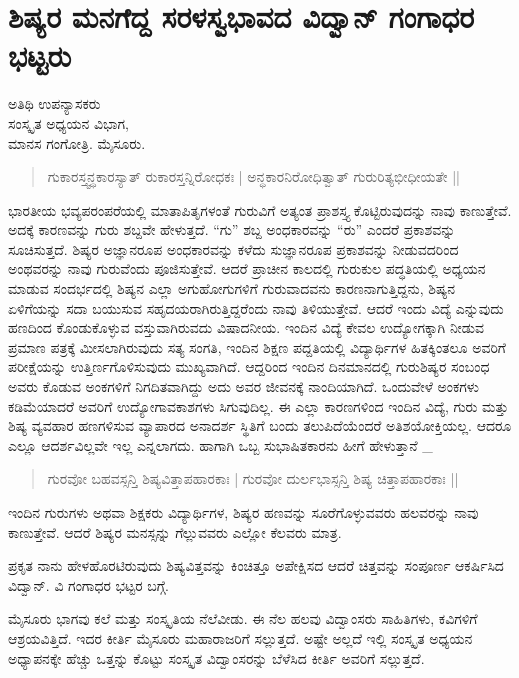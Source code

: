 \chapter{ಶಿಷ್ಯರ ಮನಗೆದ್ದ ಸರಳಸ್ವಭಾವದ ವಿದ್ವಾನ್ ಗಂಗಾಧರ ಭಟ್ಟರು}

\begin{center}
\smallskip
ಅತಿಥಿ ಉಪನ್ಯಾಸಕರು\\
ಸಂಸ್ಕೃತ ಅಧ್ಯಯನ ವಿಭಾಗ,\\
ಮಾನಸ ಗಂಗೋತ್ರಿ. ಮೈಸೂರು.

\end{center}
\begin{verse}
ಗುಕಾರಸ್ತ್ವನ್ಧಕಾರಸ್ಯಾತ್ ರುಕಾರಸ್ತನ್ನಿರೋಧಕಃ |
ಅನ್ಧಕಾರನಿರೋಧಿತ್ವಾತ್ ಗುರುರಿತ್ಯಭೀಧೀಯತೇ ||
\end{verse}
ಭಾರತೀಯ ಭವ್ಯಪರಂಪರೆಯಲ್ಲಿ ಮಾತಾಪಿತೃಗಳಂತೆ ಗುರುವಿಗೆ ಅತ್ಯಂತ ಪ್ರಾಶಸ್ತ್ಯ ಕೊಟ್ಟಿರುವುದನ್ನು ನಾವು ಕಾಣುತ್ತೇವೆ. ಅದಕ್ಕೆ ಕಾರಣವನ್ನು ಗುರು ಶಬ್ದವೇ ಹೇಳುತ್ತದೆ. “ಗು” ಶಬ್ದ ಅಂಧಕಾರವನ್ನು “ರು” ಎಂದರೆ ಪ್ರಕಾಶವನ್ನು ಸೂಚಿಸುತ್ತದೆ. ಶಿಷ್ಯರ ಅಜ್ಞಾನರೂಪ ಅಂಧಕಾರವನ್ನು ಕಳೆದು ಸುಜ್ಞಾನರೂಪ ಪ್ರಕಾಶವನ್ನು ನೀಡುವದರಿಂದ ಅಂಥವರನ್ನು ನಾವು ಗುರುವೆಂದು ಪೂಜಿಸುತ್ತೇವೆ. ಆದರೆ ಪ್ರಾಚೀನ ಕಾಲದಲ್ಲಿ ಗುರುಕುಲ ಪದ್ಧತಿಯಲ್ಲಿ ಅಧ್ಯಯನ ಮಾಡುವ ಸಂದರ್ಭದಲ್ಲಿ ಶಿಷ್ಯನ ಎಲ್ಲಾ ಅಗುಹೋಗುಗಳಿಗೆ ಗುರುವಾದವನು ಕಾರಣನಾಗುತ್ತಿದ್ದನು, ಶಿಷ್ಯನ ಏಳಿಗೆಯನ್ನು ಸದಾ ಬಯುಸುವ ಸಹೃದಯರಾಗಿರುತ್ತಿದ್ದರೆಂದು ನಾವು ತಿಳಿಯುತ್ತೇವೆ. ಆದರೆ ಇಂದು ವಿದ್ಯೆ ಎನ್ನುವುದು ಹಣದಿಂದ ಕೊಂಡುಕೊಳ್ಳುವ ವಸ್ತುವಾಗಿರುವದು ವಿಷಾದನೀಯ. ಇಂದಿನ ವಿದ್ಯೆ ಕೇವಲ ಉದ್ಯೋಗಕ್ಕಾಗಿ ನೀಡುವ ಪ್ರಮಾಣ ಪತ್ರಕ್ಕೆ ಮೀಸಲಾಗಿರುವುದು ಸತ್ಯ ಸಂಗತಿ, ಇಂದಿನ ಶಿಕ್ಷಣ ಪದ್ದತಿಯಲ್ಲಿ ವಿದ್ಯಾರ್ಥಿಗಳ ಹಿತಕ್ಕಿಂತಲೂ ಅವರಿಗೆ ಪರೀಕ್ಷೆಯನ್ನು ಉತ್ತಿರ್ಣಗೊಳಿಸುವುದು ಮುಖ್ಯವಾಗಿದೆ. ಆದ್ದರಿಂದ ಇಂದಿನ ದಿನಮಾನದಲ್ಲಿ ಗುರುಶಿಷ್ಯರ ಸಂಬಂಧ ಅವರು ಕೊಡುವ ಅಂಕಗಳಿಗೆ ನಿಗದಿತವಾಗಿದ್ದು ಅದು ಅವರ ಜೀವನಕ್ಕೆ ನಾಂದಿಯಾಗಿದೆ. ಒಂದುವೇಳೆ ಅಂಕಗಳು ಕಡಿಮೆಯಾದರೆ ಅವರಿಗೆ ಉದ್ಯೋಗಾವಕಾಶಗಳು ಸಿಗುವುದಿಲ್ಲ. ಈ ಎಲ್ಲಾ ಕಾರಣಗಳಿಂದ ಇಂದಿನ ವಿದ್ಯೆ, ಗುರು ಮತ್ತು ಶಿಷ್ಯ ವ್ಯವಹಾರ ಹಣಗಳಿಸುವ ವ್ಯಾಪಾರದ ಅನಾದರ್ಶ ಸ್ಥಿತಿಗೆ ಬಂದು ತಲುಪಿದೆಯೆಂದರೆ ಅತಿಶಯೋಕ್ತಿಯಲ್ಲ. ಆದರೂ ಎಲ್ಲೂ ಆದರ್ಶವಿಲ್ಲವೇ ಇಲ್ಲ ಎನ್ನಲಾಗದು. ಹಾಗಾಗಿ ಒಬ್ಬ ಸುಭಾಷಿತಕಾರನು ಹೀಗೆ ಹೇಳುತ್ತಾನೆ _
\begin{verse}
ಗುರವೋ ಬಹವಸ್ಸನ್ತಿ ಶಿಷ್ಯವಿತ್ತಾಪಹಾರಕಾಃ |
ಗುರವೋ ದುರ್ಲಭಾಸ್ಸನ್ತಿ ಶಿಷ್ಯ ಚಿತ್ತಾಪಹಾರಕಾಃ ||
\end{verse}
ಇಂದಿನ ಗುರುಗಳು ಅಥವಾ ಶಿಕ್ಷಕರು ವಿದ್ಯಾರ್ಥಿಗಳ, ಶಿಷ್ಯರ ಹಣವನ್ನು ಸೂರೆಗೊಳ್ಳುವವರು ಹಲವರನ್ನು ನಾವು ಕಾಣುತ್ತೇವೆ. ಆದರೆ ಶಿಷ್ಯರ ಮನಸ್ಸನ್ನು ಗೆಲ್ಲುವವರು ಎಲ್ಲೋ ಕೆಲವರು ಮಾತ್ರ.

ಪ್ರಕೃತ ನಾನು ಹೇಳಹೊರಟಿರುವುದು ಶಿಷ್ಯವಿತ್ತವನ್ನು ಕಿಂಚಿತ್ತೂ ಅಪೇಕ್ಷಿಸದ ಆದರೆ ಚಿತ್ತವನ್ನು ಸಂಪೂರ್ಣ ಆಕರ್ಷಿಸಿದ ವಿದ್ವಾನ್. ವಿ ಗಂಗಾಧರ ಭಟ್ಟರ ಬಗ್ಗೆ.

ಮೈಸೂರು ಭಾಗವು ಕಲೆ ಮತ್ತು ಸಂಸ್ಕೃತಿಯ ನೆಲೆವೀಡು. ಈ ನೆಲ ಹಲವು ವಿದ್ವಾಂಸರು ಸಾಹಿತಿಗಳು, ಕವಿಗಳಿಗೆ ಆಶ್ರಯವಿತ್ತಿದೆ. ಇದರ ಕೀರ್ತಿ ಮೈಸೂರು ಮಹಾರಾಜರಿಗೆ ಸಲ್ಲುತ್ತದೆ. ಅಷ್ಟೇ ಅಲ್ಲದೆ ಇಲ್ಲಿ ಸಂಸ್ಕೃತ ಅಧ್ಯಯನ ಅಧ್ಯಾಪನಕ್ಕೇ ಹೆಚ್ಚು ಒತ್ತನ್ನು ಕೊಟ್ಟು ಸಂಸ್ಕೃತ ವಿದ್ವಾಂಸರನ್ನು ಬೆಳೆಸಿದ ಕೀರ್ತಿ ಅವರಿಗೆ ಸಲ್ಲುತ್ತದೆ.

